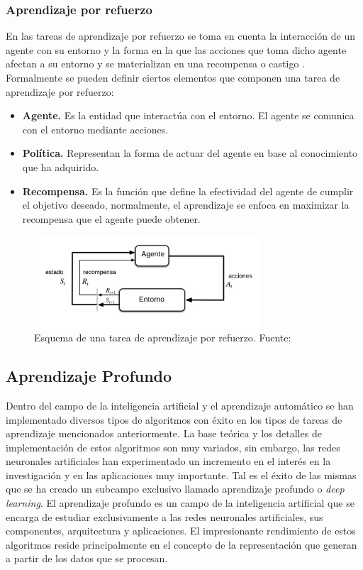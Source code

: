         \subsubsection{Aprendizaje por refuerzo}
        En las tareas de aprendizaje por refuerzo se toma en cuenta la interacción de un agente con su entorno y la forma 
        en la que las acciones que toma dicho agente afectan a su entorno y se materializan en una recompensa o castigo \cite{sutton2018reinforcement}. Formalmente
        se pueden definir ciertos elementos que componen una tarea de aprendizaje por refuerzo:
        \begin{itemize}
            \item \textbf{Agente.} Es la entidad que interactúa con el entorno. El agente se comunica con el entorno mediante acciones.
            \item \textbf{Política.} Representan la forma de actuar del agente en base al conocimiento que ha adquirido.
            \item \textbf{Recompensa.} Es la función que define la efectividad del agente de cumplir el objetivo deseado, normalmente, el aprendizaje se enfoca en maximizar la recompensa que el agente puede obtener. 
        \end{itemize}
        
        \begin{figure}[!h] 
            \centering
            \includegraphics[width=0.75\textwidth]{img/refuerzo}
            \caption{Esquema de una tarea de aprendizaje por refuerzo. Fuente: \cite{bhatt_2018} }
            \label{fig:refuerzo}
        \end{figure}

        
    \subsection{Aprendizaje Profundo}
    Dentro del campo de la inteligencia artificial y el aprendizaje automático se han implementado diversos tipos 
    de algoritmos con éxito en los tipos de tareas de aprendizaje mencionados anteriormente. La base teórica y los detalles 
    de implementación de estos algoritmos son muy variados, sin embargo, las redes neuronales artificiales han experimentado 
    un incremento en el interés en la investigación y en las aplicaciones muy importante. Tal es el éxito de las mismas 
    que se ha creado un subcampo exclusivo llamado aprendizaje profundo o \textit{deep learning}. El aprendizaje profundo 
    es un campo de la inteligencia artificial que se encarga de estudiar exclusivamente a las redes neuronales artificiales, 
    sus componentes, arquitectura y aplicaciones. El impresionante rendimiento de estos algoritmos reside principalmente en el 
    concepto de la representación que generan a partir de los datos que se procesan. 

